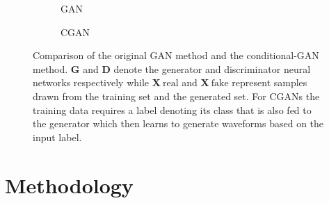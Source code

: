 \documentclass[12pt]{iopart}
\newcommand{\chris}[1]{\textbf{\textcolor{green}{CHRIS: #1}}}
\begin{document}
\begin{figure}[h!]
    \begin{subfigure}{.5\textwidth}
     \centering
        
        \caption{GAN}
    \end{subfigure}
    \begin{subfigure}{.5\textwidth}
     \centering
        
        \caption{CGAN}
    \end{subfigure}
    \caption{Comparison of the original GAN method and the
conditional-GAN method. $\textbf{G}$ and $\textbf{D}$ denote the generator and discriminator neural networks respectively while $\textbf{X}~\text{real}$ and $\textbf{X}~\text{fake}$ represent samples drawn from the training set and the generated set. For CGANs the training data requires a label denoting
its class that is also fed to the generator which then learns to generate
waveforms based on the input label.}

\label{fig:gan_comparison}
\end{figure}

\section{Methodology}

\end{document}
